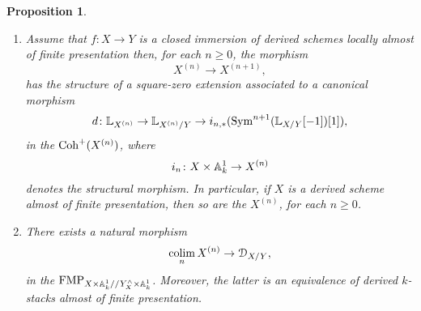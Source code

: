 \documentclass[10pt,a4paper,reqno]{amsart} %
\theoremstyle{plain}
\newtheorem{prop}[thm]{Proposition}
\theoremstyle{definition}
\theoremstyle{remark}
\numberwithin{equation}{section}
\begin{document}
\begin{prop}
\begin{enumerate}
            \[
                i_{n, *}(\Sym^{n+1}(\bbL_{X/ Y}[-1])[1])  \in \pro(\Coh^b(X^{(n)})).
            \]
        \item Assume that $f \colon X \to Y$
        is a closed immersion of derived schemes locally almost of finite presentation then, for each $n \ge 0$, the morphism
            \[
                X^{(n)} \to X^{(n+1)},  
            \]
        has the structure of a square-zero extension associated to a canonical morphism
            \[d \colon \mathbb L_{X^{(n)}} \to \mathbb L_{X^{(n)}/ Y} \to i_{n, *} (\operatorname{Sym}^{n+1}(\mathbb L_{X/ Y}[-1])[1]),\]
        in the \infcat $\mathrm{Coh}^+(X^{(n)})$, where 
            \[
                i_n \colon X \times \mathbb A^1_k \to X^{(n)}
            \]
        denotes the structural morphism.
        In particular, if $X$ is a derived scheme almost of finite presentation, then so are the $X^{(n)}$, for each $n \ge 0$.
        \item There exists a natural morphism
            \[\operatorname*{colim}_{n} X^{(n)} \to \mathcal D_{X/Y},\]
        in the \infcat $\mathrm{FMP}_{X \times \mathbb A^1_k/ /Y^\wedge_X \times\mathbb A^1_k}$. Moreover, the latter is an equivalence
        of derived $k$-stacks almost of finite presentation.
    \end{enumerate}
\end{prop}
\end{document}
